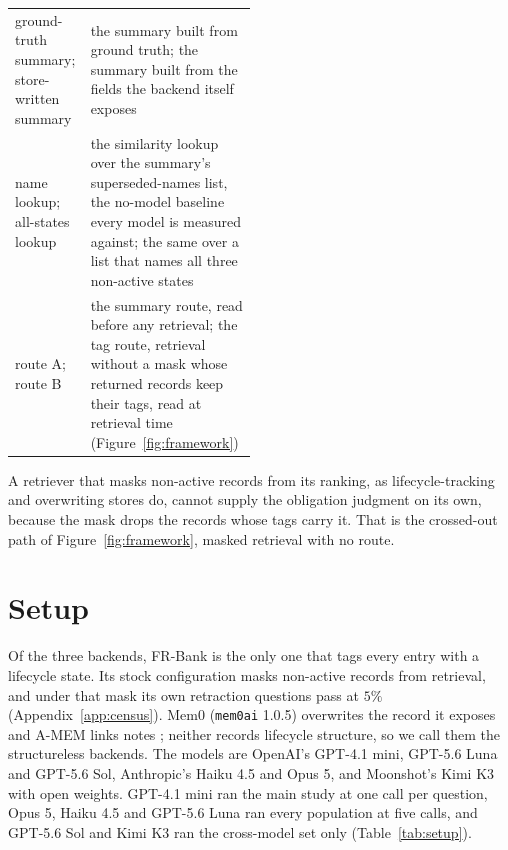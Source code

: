 \documentclass{article}
\begin{document}
\begin{center}
{\begin{minipage}{0.97\linewidth}
\begin{tabular}[t]{@{}p{0.115\linewidth}p{0.36\linewidth}@{}}
ground-truth summary; store-written summary & the summary built from ground truth; the summary built from the fields the backend itself exposes \\
name lookup; all-states lookup & the similarity lookup over the summary's superseded-names list, the no-model baseline every model is measured against; the same over a list that names all three non-active states \\
route A; route B & the summary route, read before any retrieval; the tag route, retrieval without a mask whose returned records keep their tags, read at retrieval time (Figure~\ref{fig:framework}) \\
\end{tabular}
\end{minipage}}
\end{center}

A retriever that masks non-active records from its ranking, as lifecycle-tracking and overwriting stores do, cannot supply the obligation judgment on its own, because the mask drops the records whose tags carry it.
That is the crossed-out path of Figure~\ref{fig:framework}, masked retrieval with no route.

\section{Setup}\label{sec:setup}

Of the three backends, FR-Bank \citep{fr} is the only one that tags every entry with a lifecycle state.
Its stock configuration masks non-active records from retrieval, and under that mask its own retraction questions pass at $5\%$ (Appendix~\ref{app:census}).
Mem0 (\texttt{mem0ai} 1.0.5) overwrites the record it exposes and A-MEM links notes \citep{mem0,amem}; neither records lifecycle structure, so we call them the structureless backends.
The models are OpenAI's GPT-4.1 mini, GPT-5.6 Luna and GPT-5.6 Sol, Anthropic's Haiku 4.5 and Opus 5, and Moonshot's Kimi K3 with open weights.
GPT-4.1 mini ran the main study at one call per question, Opus 5, Haiku 4.5 and GPT-5.6 Luna ran every population at five calls, and GPT-5.6 Sol and Kimi K3 ran the cross-model set only (Table~\ref{tab:setup}).
\end{document}
